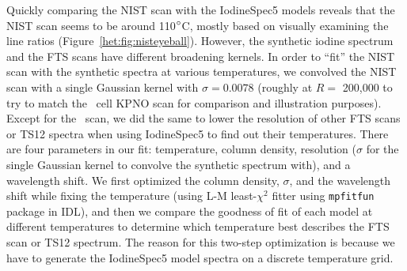Quickly comparing the NIST scan with the IodineSpec5 models reveals
that the NIST scan seems to be around 110$^{\circ}$C, mostly based on
visually examining the line ratios
(Figure~\ref{het:fig:nisteyeball}). However, the synthetic iodine
spectrum and the FTS scans have different broadening kernels. In order
to ``fit'' the NIST scan with the synthetic spectra at various
temperatures, we convolved the NIST scan with a single Gaussian kernel
with $\sigma=0.0078$ (roughly at $R=$ 200,000 to try to match the
\keck\ cell KPNO scan for comparison and illustration
purposes). Except for the \keck\ scan, we did the same to lower the
resolution of other FTS scans or TS12 spectra when using IodineSpec5
to find out their temperatures. There are four parameters in our
fit: temperature, column density, resolution ($\sigma$ for the single
Gaussian kernel to convolve the synthetic spectrum with), and a
wavelength shift. We first optimized the column density, $\sigma$, and
the wavelength shift while fixing the temperature (using L-M
least-$\chi^2$ fitter using {\tt mpfitfun} package in IDL), and then
we compare the goodness of fit of each model at different temperatures
to determine which temperature best describes the FTS scan or TS12
spectrum. The reason for this two-step optimization is because we have
to generate the IodineSpec5 model spectra on a discrete temperature
grid.


